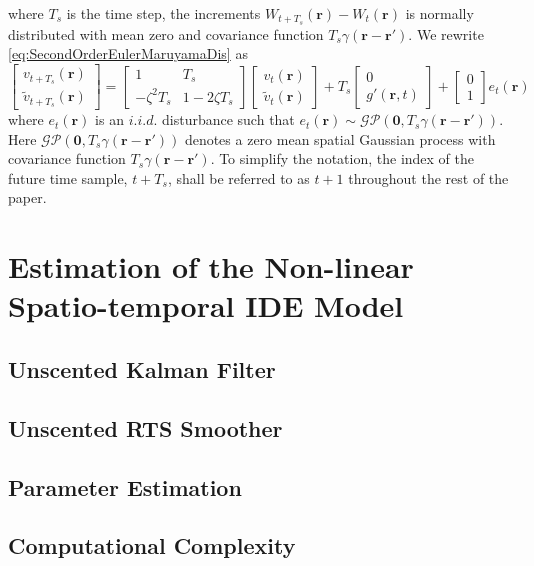 \documentclass[a4paper,10pt]{article}
\begin{document}
where $T_s$ is the time step, the increments $W_{t+T_s}(\mathbf r)-W_t(\mathbf r)$ is normally distributed with mean zero and covariance function $T_s\gamma(\mathbf r-\mathbf r')$. We rewrite \eqref{eq:SecondOrderEulerMaruyamaDis} as
\begin{equation}
 \begin{bmatrix} v_{t+T_s}(\mathbf r) \\ \tilde{v}_{t+T_s}(\mathbf r)\end{bmatrix}=\begin{bmatrix}1 & T_s \\ -\zeta^2 T_s & 1-2\zeta T_s \end{bmatrix}\begin{bmatrix} v_t(\mathbf r)\\ \tilde{v}_t(\mathbf r)\end{bmatrix}+T_s\begin{bmatrix}0 \\ g'(\mathbf r, t)\end{bmatrix}+\begin{bmatrix}0 \\ 1 \end{bmatrix}e_t(\mathbf r)
\end{equation}
 where $e_t(\mathbf{r})$ is an $i.i.d.$ disturbance such that $e_t(\mathbf{r})\sim\mathcal{GP}(\mathbf 0,T_s\gamma(\mathbf{r}-\mathbf{r}'))$. Here $\mathcal{GP}(\mathbf 0,T_s\gamma(\mathbf{r}-\mathbf{r}'))$ denotes a zero mean spatial Gaussian process with covariance function $T_s\gamma(\mathbf{r}-\mathbf{r}')$. To simplify the notation, the index of the future time sample, $t+T_s$, shall be referred to as $t+1$ throughout the rest of the paper. 
\section{Estimation of the Non-linear Spatio-temporal IDE Model}

\subsection{Unscented Kalman Filter}
\subsection{Unscented RTS Smoother}
\subsection{Parameter Estimation}
\subsection{Computational Complexity}
\end{document}
